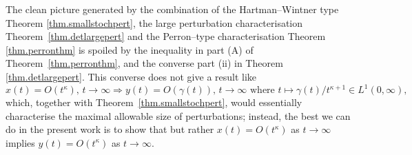 \documentclass[a4paper,10pt,reqno]{amsart}
\numberwithin{equation}{section}
\newtheorem{theorem}{Theorem}
\theoremstyle{definition}
\theoremstyle{remark}
\DeclareMathOperator{\1}{\mathbbm 1}
\begin{document}
%

The clean picture generated by the combination of the Hartman--Wintner type Theorem \ref{thm.smallstochpert}, the large perturbation characterisation Theorem~\ref{thm.detlargepert} and the Perron--type characterisation Theorem \ref{thm.perronthm} is spoiled by the inequality in part (A) of Theorem~\ref{thm.perronthm}, and the converse part (ii) in Theorem \ref{thm.detlargepert}. This converse does not give a result like 
\[
x(t)=O(t^\kappa), \, t\to\infty \Longrightarrow
y(t)=O(\gamma(t)), \,t\to\infty  \text{ where }  t\mapsto \gamma(t)/t^{\kappa+1}\in L^1(0,\infty),
\] 
which, together with Theorem~\ref{thm.smallstochpert}, would essentially characterise the maximal allowable size of perturbations; instead, the best we can do in the present work is to show that  
but rather $x(t)=O(t^\kappa)$ as $t\to\infty$ implies $y(t)=O(t^\kappa)$ as $t\to\infty$. 
\end{document}
